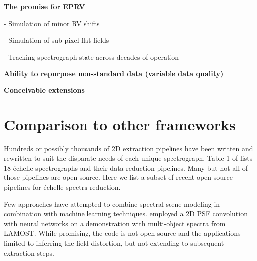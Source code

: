 \documentclass[twocolumn]{aastex63}
\begin{document}
\begin{mdframed}
  \textbf{The promise for EPRV} \par
  - Simulation of minor RV shifts\par
  - Simulation of sub-pixel flat fields \par
  - Tracking spectrograph state across decades of operation\par
  \textcolor{lightgray}{\lipsum[14]}
\end{mdframed}


\begin{mdframed}
  \textbf{Ability to repurpose non-standard data (variable data quality)} \par
  \textcolor{lightgray}{\lipsum[15]}
\end{mdframed}


\begin{mdframed}
  \textbf{Conceivable extensions} \par
  \textcolor{lightgray}{\lipsum[16]}
\end{mdframed}



\acknowledgements




\appendix

\section{Comparison to other frameworks}

Hundreds or possibly thousands of 2D extraction pipelines have been written and rewritten to suit the disparate needs of each unique spectrograph.  Table 1 of \citet{2022PASP..134k4509C} lists 18 \'echelle spectrographs and their data reduction pipelines.  Many but not all of those pipelines are open source.  Here we list a subset of recent open source pipelines for \'echelle spectra reduction.

Few approaches have attempted to combine spectral scene modeling in combination with machine learning techniques.  \citet{2020MNRAS.499.1972X} employed a 2D PSF convolution with neural networks on a demonstration with multi-object spectra from LAMOST.  While promising, the code is not open source and the applications limited to inferring the field distortion, but not extending to subsequent extraction steps.
\end{document}
